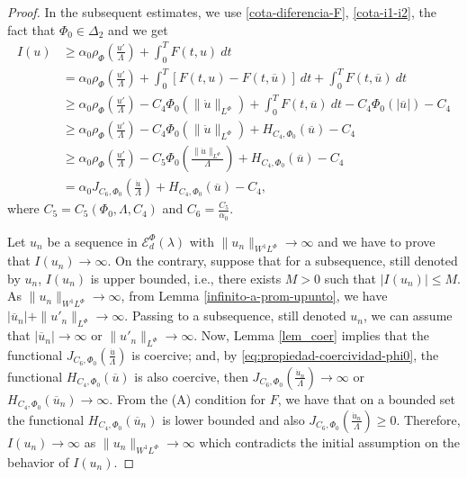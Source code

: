\documentclass[twoside]{article}
\theoremstyle{remark}
\newcommand{\orlnor}{\|_{L^{\Phi}}}
\newcommand{\lphi}{L^{\Phi}}
\newcommand{\sobnor}{\|_{W^{1}\lphi}}
\newcommand{\domi}{\mathcal{E}^{\Phi}_d(\lambda)}
\renewcommand{\leq}{\leqslant}
\renewcommand{\geq}{\geqslant}
\begin{document}
\begin{proof}
In the subsequent estimates, we use  \eqref{cota-diferencia-F},
\eqref{cota-i1-i2}, the fact that $\Phi_0 \in \Delta_2$ and we get
\begin{equation}\label{cota_inf_I}
\begin{split}
I(u)&\geq\alpha_0\rho_{\Phi}\left( \frac{u'}{\Lambda}\right)+\int_0^TF(t,u)\ dt
\\ 
&=\alpha_0\rho_{\Phi}\left( \frac{u'}{\Lambda}\right)+ \int_0^T \left[F(t,u)-F(t,\overline{u})\right]\ dt
+  \int_0^TF(t,\overline{u})\ dt
\\
&\geq \alpha_0\rho_{\Phi}\left( \frac{u'}{\Lambda}\right)
-C_4 \Phi_0(\|\dot{u}\orlnor)
+\int_0^TF(t,\overline{u})\ dt-
C_4 \Phi_0(|\overline{u}|)-
C_4 
\\
&\geq
\alpha_0\rho_{\Phi}\left( \frac{u'}{\Lambda}\right)
-C_4 \Phi_0(\|\dot{u}\orlnor)
+H_{C_4, \Phi_0}(\overline{u})
-C_4 
\\&\geq
\alpha_0\rho_{\Phi}\left( \frac{u'}{\Lambda}\right)
-C_5 \Phi_0\left(\frac{\|\dot{u}\orlnor}{\Lambda} \right)
+H_{C_4, \Phi_0}(\overline{u})
-C_4 
\\&=
\alpha_0J_{C_6,\Phi_0}\left(\frac{\dot{u}}{\Lambda}\right)
+H_{C_4, \Phi_0}(\overline{u})
-C_4, 
\end{split}
\end{equation}
where $C_5=C_5(\Phi_0,\Lambda,C_4)$ and $C_6=\frac{C_5}{\alpha_0}$.



Let $u_n$ be  a sequence in $\domi$ with
$\|u_n\sobnor\to\infty$ and we have to prove that $I(u_n)\to\infty$.
On the contrary, suppose  that for a subsequence,
still denoted by $u_n$, $I(u_n)$ is upper bounded, i.e., there exists $M>0$ such that $|I(u_{n})|\leq M$.
As $\|u_n\sobnor\to\infty$, from Lemma \ref{infinito-a-prom-upunto},  we have $|\overline{u}_n|+\|u'_n\orlnor\to \infty$. Passing to a subsequence, still denoted $u_n$, we can assume that $|\overline{u}_n|\to \infty$ or $\|u'_n\orlnor\to \infty$.
Now, Lemma \ref{lem_coer} implies that the functional $J_{C_6,\Phi_0}(\frac{\dot{u}}{\Lambda})$ is coercive;
and, by \eqref{eq:propiedad-coercividad-phi0},
the functional $H_{C_4,\Phi_0}(\overline{u})$ is also coercive, then
$J_{C_6,\Phi_0}(\frac{\dot{u}_n}{\Lambda}) \to \infty$ or $H_{C_4,\Phi_0}(\overline{u}_n)\to \infty$.
From the (A) condition for $F$, we have that on a bounded set the functional $H_{C_4,\Phi_0}(\overline{u}_n)$ is lower bounded and also $J_{C_6,\Phi_0}(\frac{\dot{u}_n}{\Lambda})\geq 0$.
Therefore,  $I(u_n)\to\infty$ as $\|u_n\sobnor\to\infty$ which contradicts the initial assumption on the behavior of $I(u_n)$.


\end{proof}
\end{document}
